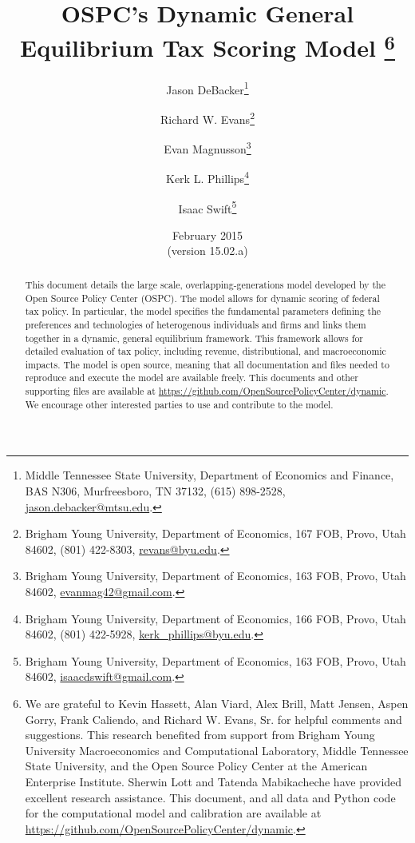 \documentclass[12pt]{report}
\theoremstyle{definition}
\begin{document}
\begin{titlepage}
  \title{OSPC's Dynamic General Equilibrium Tax Scoring Model
    \thanks{We are grateful to Kevin Hassett, Alan Viard, Alex Brill, Matt Jensen, Aspen Gorry, Frank Caliendo, and Richard W. Evans, Sr. for helpful comments and suggestions. This research benefited from support from Brigham Young University Macroeconomics and Computational Laboratory, Middle Tennessee State University, and the Open Source Policy Center at the American Enterprise Institute. Sherwin Lott and Tatenda Mabikacheche have provided excellent research assistance.  This document, and all data and Python code for the computational model and calibration are available at \href{https://github.com/OpenSourcePolicyCenter/dynamic}{https://github.com/OpenSourcePolicyCenter/dynamic}.} }

  \author{
  Jason DeBacker\footnote{Middle Tennessee State University, Department of Economics and Finance, BAS N306, Murfreesboro, TN 37132, (615) 898-2528, \href{mailto:jason.debacker@mtsu.edu}{jason.debacker@mtsu.edu}.} \\[-2pt]
  \and
  Richard W. Evans\footnote{Brigham Young University, Department of Economics, 167 FOB, Provo, Utah 84602, (801) 422-8303, \href{mailto:revans@byu.edu}{revans@byu.edu}.} \\[-2pt]
  \and
  Evan Magnusson\footnote{Brigham Young University, Department of Economics, 163 FOB, Provo, Utah 84602, \href{mailto:evanmag42@gmail.com}{evanmag42@gmail.com}.} \\[-2pt]
  \and
  Kerk L. Phillips\footnote{Brigham Young University, Department of Economics, 166 FOB, Provo, Utah 84602, (801) 422-5928, \href{mailto:kerk_phillips@byu.edu}{kerk\_phillips@byu.edu}.} \\[-2pt]
  \and
  Isaac Swift\footnote{Brigham Young University, Department of Economics, 163 FOB, Provo, Utah 84602, \href{mailto:isaacdswift@gmail.com}{isaacdswift@gmail.com}.} \\[-2pt]}
  \date{February 2015 \\
  \scriptsize{(version 15.02.a)}}
  \maketitle
  \begin{abstract}
  \small{This document details the large scale, overlapping-generations model developed by the Open Source Policy Center (OSPC).  The model allows for dynamic scoring of federal tax policy.  In particular, the model specifies the fundamental parameters defining the preferences and technologies of heterogenous individuals and firms and links them together in a dynamic, general equilibrium framework.  This framework allows for detailed evaluation of tax policy, including revenue, distributional, and macroeconomic impacts.  The model is open source, meaning that all documentation and files needed to reproduce and execute the model are available freely.  This documents and other supporting files are available at \href{https://github.com/OpenSourcePolicyCenter/dynamic}{https://github.com/OpenSourcePolicyCenter/dynamic}.  We encourage other interested parties to use and contribute to the model.}


\end{abstract}
\end{titlepage}
\end{document}
